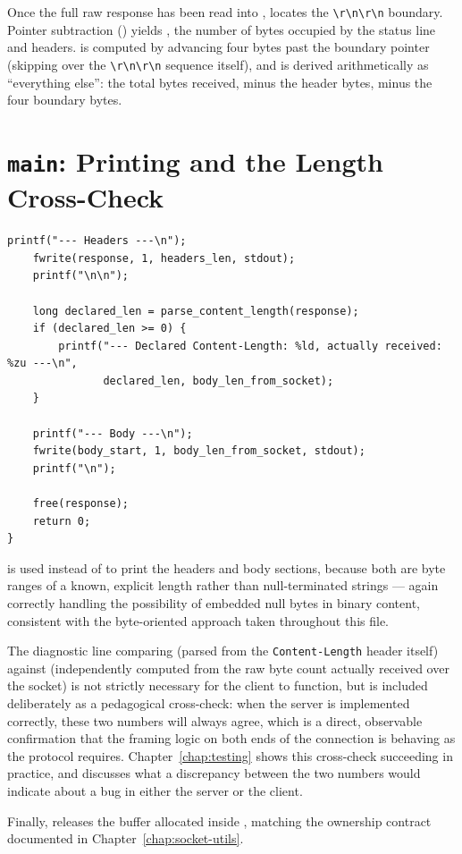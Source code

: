 Once the full raw response has been read into ,  locates the \texttt{\textbackslash r\textbackslash n\textbackslash r\textbackslash n} boundary. Pointer subtraction () yields , the number of bytes occupied by the status line and headers.  is computed by advancing four bytes past the boundary pointer (skipping over the \texttt{\textbackslash r\textbackslash n\textbackslash r\textbackslash n} sequence itself), and  is derived arithmetically as ``everything else'': the total bytes received, minus the header bytes, minus the four boundary bytes.

\section{\texttt{main}: Printing and the Length Cross-Check}

\begin{lstlisting}[style=cstyle]
    printf("--- Headers ---\n");
    fwrite(response, 1, headers_len, stdout);
    printf("\n\n");

    long declared_len = parse_content_length(response);
    if (declared_len >= 0) {
        printf("--- Declared Content-Length: %ld, actually received: %zu ---\n",
               declared_len, body_len_from_socket);
    }

    printf("--- Body ---\n");
    fwrite(body_start, 1, body_len_from_socket, stdout);
    printf("\n");

    free(response);
    return 0;
}
\end{lstlisting}

 is used instead of  to print the headers and body sections, because both are byte ranges of a known, explicit length rather than null-terminated strings --- again correctly handling the possibility of embedded null bytes in binary content, consistent with the byte-oriented approach taken throughout this file.

The diagnostic line comparing  (parsed from the \texttt{Content-Length} header itself) against  (independently computed from the raw byte count actually received over the socket) is not strictly necessary for the client to function, but is included deliberately as a pedagogical cross-check: when the server is implemented correctly, these two numbers will always agree, which is a direct, observable confirmation that the framing logic on both ends of the connection is behaving as the protocol requires. Chapter~\ref{chap:testing} shows this cross-check succeeding in practice, and discusses what a discrepancy between the two numbers would indicate about a bug in either the server or the client.

Finally,  releases the buffer allocated inside , matching the ownership contract documented in Chapter~\ref{chap:socket-utils}.
